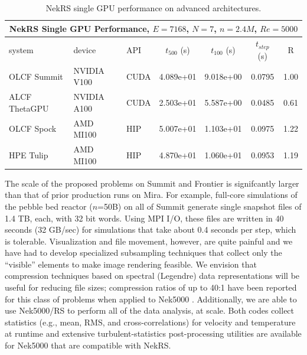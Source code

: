  \begin{table}[!t]
  \footnotesize
  \begin{center}
  \begin{tabular}{|l|l|l|c|c|c|c|}
  \hline
  \multicolumn{7}{|c|}{{\bf NekRS Single GPU Performance, $E=7168$, $N=7$, $n=2.4M$, $Re=5000$}} \\
  \hline
   system   & device &   API &  $t_{500}$ (s)    &   $t_{100}$  (s)  &   $t_{step}$ (s) & R \\
  \hline
    OLCF Summit   & NVIDIA V100  &  CUDA   &    4.089e+01  &  9.018e+00 &  0.0795 & 1.00   \\
    ALCF ThetaGPU & NVIDIA A100  &  CUDA   &    2.503e+01  &  5.587e+00 &  0.0485 & 0.61   \\
    OLCF Spock    & AMD MI100    &  HIP    &    5.007e+01  &  1.103e+01 &  0.0975 & 1.22   \\
    HPE Tulip     & AMD MI100    &  HIP    &    4.870e+01  &  1.060e+01 &  0.0953 & 1.19   \\
  \hline
  \end{tabular}
  \end{center}
  \caption{\small\label{singlerod} NekRS single GPU performance on advanced architectures.}
 \end{table}


The scale of the proposed problems on Summit and Frontier is signifcantly
larger than that of prior production runs on Mira.  For example, full-core
simulations of the pebble bed reactor  ($n$=50B) on all of Summit generate
single snapshot files of 1.4 TB, each, with 32 bit words.  Using MPI I/O, these
files are written in 40 seconds (32 GB/sec) for simulations that take about 0.4
seconds per step, which is tolerable.   Visualization and file movement,
however, are quite painful and we have had to develop specialized subsampling
techniques that collect only the ``visible'' elements to make image rendering
feasible.  We envision that compression techniques based on spectral (Legendre)
data representations will be useful for reducing file sizes; compression ratios
of up to 40:1 have been reported for this class of problems when applied to
Nek5000 \cite{otero18}.  Additionally, we are able to use Nek5000/RS to perform
all of the data analysis, at scale.  Both codes collect statistics (e.g., mean,
RMS, and cross-correlations) for velocity and temperature at runtime and
extensive turbulent-statistics post-processing utilities are available for
Nek5000 that are compatible with NekRS. 

